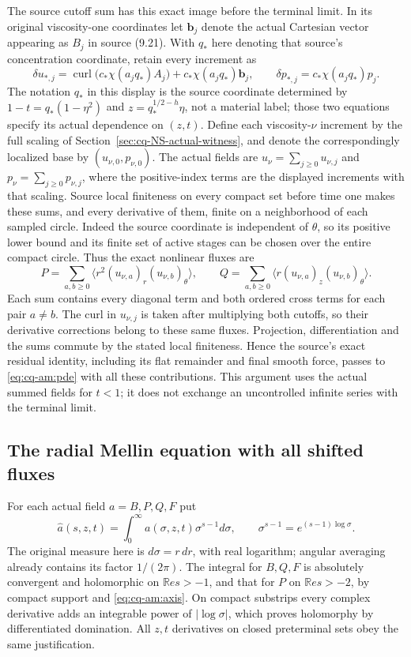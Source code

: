 The source cutoff sum has this exact image before the terminal limit.
In its original viscosity-one coordinates let
$\mathbf b_j$ denote the actual Cartesian vector appearing as $B_j$
in source (9.21). With $q_*$ here denoting that source's concentration
coordinate, retain every increment as
\[
 \delta u_{*,j}=\operatorname{curl}
          \bigl(c_*\chi(a_jq_*)A_j\bigr)
                  +c_*\chi(a_jq_*)\mathbf b_j,
 \qquad
 \delta p_{*,j}=c_*\chi(a_jq_*)p_j.
\]
The notation $q_*$ in this display is the source coordinate determined
by $1-t=q_*(1-\eta^2)$ and $z=q_*^{1/2-h}\eta$, not a material
label; those two equations specify its actual dependence on $(z,t)$.
Define each viscosity-$\nu$ increment by the full scaling of Section~\ref{sec:cq-NS-actual-witness}, and denote the correspondingly localized base by
$(u_{\nu,0},p_{\nu,0})$. The actual fields are
$u_\nu=\sum_{j\geq0}u_{\nu,j}$ and
$p_\nu=\sum_{j\geq0}p_{\nu,j}$, where the positive-index terms are
the displayed increments with that scaling. Source local finiteness
on every compact set before time one makes these sums, and every
derivative of them, finite on a neighborhood of each sampled circle.
Indeed the source coordinate is independent of $\theta$, so its
positive lower bound and its finite set of active stages can be
chosen over the entire compact circle. Thus the exact nonlinear fluxes
are
\[
 P=\sum_{a,b\geq0}\langle r^2(u_{\nu,a})_r(u_{\nu,b})_\theta\rangle,
 \qquad
 Q=\sum_{a,b\geq0}\langle r(u_{\nu,a})_z(u_{\nu,b})_\theta\rangle.
\]
Each sum contains every diagonal term and both ordered cross terms
for each pair $a\ne b$. The curl in $u_{\nu,j}$ is taken after
multiplying both cutoffs, so their derivative corrections belong to
these same fluxes. Projection, differentiation and the sums commute
by the stated local finiteness. Hence the source's exact residual
identity, including its flat remainder and final smooth force,
passes to \eqref{eq:cq-am:pde} with all these contributions. This argument
uses the actual summed fields for $t<1$; it does not exchange an
uncontrolled infinite series with the terminal limit.

\subsection{The radial Mellin equation with all shifted fluxes}

For each actual field $a=B,P,Q,F$ put
\[
 \widehat a(s,z,t)=\int_0^\infty a(\sigma,z,t)\sigma^{s-1}d\sigma,
 \qquad \sigma^{s-1}=e^{(s-1)\log\sigma}.
\]
The original measure here is $d\sigma=r\,dr$, with real logarithm;
angular averaging already contains its factor $1/(2\pi)$.
The integral for $B,Q,F$ is absolutely convergent and holomorphic on
$\mathbb Re s>-1$, and that for $P$ on $\mathbb Re s>-2$, by compact support
and \eqref{eq:cq-am:axis}. On compact substrips every complex derivative
adds an integrable power of $|\log\sigma|$, which proves
holomorphy by differentiated domination. All $z,t$ derivatives on
closed preterminal sets obey the same justification.

